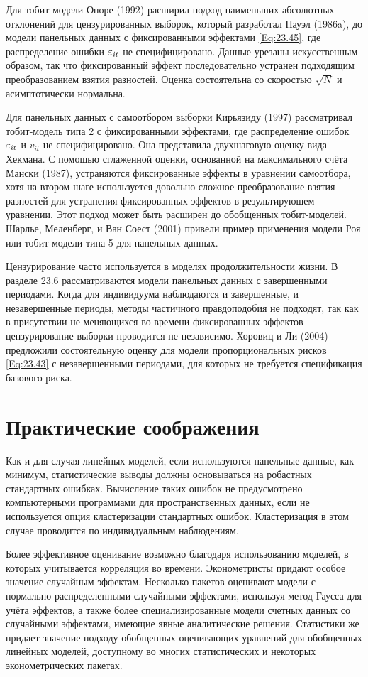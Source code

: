 Для тобит-модели Оноре (1992) расширил подход наименьших абсолютных отклонений для цензурированных выборок, который разработал Пауэл (1986a), до модели панельных данных с фиксированными эффектами \ref{Eq:23.45}, где распределение ошибки $\varepsilon_{it}$ не специфицировано. Данные урезаны искусственным образом, так что фиксированный эффект последовательно устранен подходящим преобразованием взятия разностей. Оценка состоятельна со скоростью $\sqrt{N}$ и асимптотически нормальна.

Для панельных данных с самоотбором выборки Кирьязиду (1997) рассматривал тобит-модель типа 2 с фиксированными эффектами, где распределение ошибок $\varepsilon_{it}$ и $v_{it}$  не специфицировано. Она представила двухшаговую оценку вида Хекмана. С помощью сглаженной оценки, основанной на максимального счёта Мански (1987), устраняются фиксированные эффекты в уравнении самоотбора, хотя на втором шаге используется довольно сложное преобразование взятия разностей для устранения фиксированных эффектов в результирующем уравнении. Этот подход может быть расширен до обобщенных тобит-моделей. Шарлье, Меленберг, и Ван Соест (2001) привели пример применения модели Роя или тобит-модели типа 5 для панельных данных.

Цензурирование часто используется в моделях продолжительности жизни. В разделе 23.6 рассматриваются модели панельных данных с завершенными периодами. Когда для индивидуума наблюдаются и завершенные, и незавершенные периоды, методы частичного правдоподобия не подходят, так как в присутствии не меняющихся во времени фиксированных эффектов цензурирование выборки проводится не независимо. Хоровиц и Ли (2004) предложили состоятельную оценку для  модели пропорциональных рисков \ref{Eq:23.43} с незавершенными периодами, для которых не требуется спецификация базового риска.


\section{Практические соображения}
Как и для случая линейных моделей, если используются панельные данные, как минимум, статистические выводы должны основываться на робастных стандартных ошибках. Вычисление таких ошибок не предусмотрено компьютерными программами для пространственных данных, если не используется опция  кластеризации стандартных ошибок. Кластеризация в этом случае проводится по индивидуальным наблюдениям.

Более эффективное оценивание возможно благодаря использованию моделей, в которых учитывается корреляция во времени. Эконометристы придают особое значение случайным эффектам. Несколько пакетов оценивают модели с нормально распределенными случайными эффектами, используя метод Гаусса для учёта эффектов, а также более специализированные  модели счетных данных со случайными эффектами, имеющие явные аналитические решения. Статистики же придает значение подходу обобщенных оценивающих уравнений для обобщенных линейных моделей, доступному во многих статистических и некоторых эконометрических пакетах.


